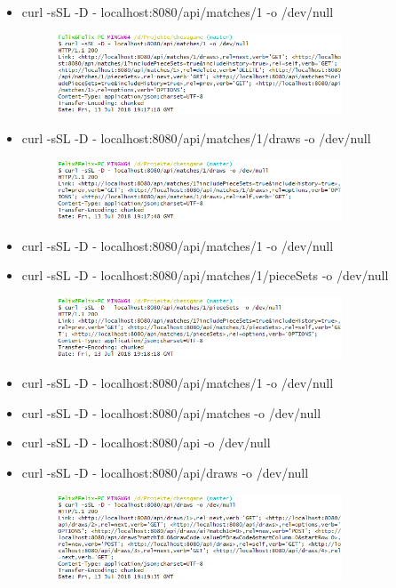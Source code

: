 \begin{enumerate}
\begin{itemize}
\begin{figure}[h]
				\end{figure}
			\item curl -sSL -D - localhost:8080/api/matches/1 -o /dev/null
				\begin{figure}[h]
					\includegraphics[width=0.8\textwidth]{images/question3.7.png}
				\end{figure}
			\item curl -sSL -D - localhost:8080/api/matches/1/draws -o /dev/null
				\begin{figure}[h]
					\includegraphics[width=0.8\textwidth]{images/question3.8.png}
				\end{figure}
			\item curl -sSL -D - localhost:8080/api/matches/1 -o /dev/null
			\item curl -sSL -D - localhost:8080/api/matches/1/pieceSets -o /dev/null
				\begin{figure}[h]
					\includegraphics[width=0.8\textwidth]{images/question3.10.png}
				\end{figure}
			\item curl -sSL -D - localhost:8080/api/matches/1 -o /dev/null
			\item curl -sSL -D - localhost:8080/api/matches -o /dev/null
			\item curl -sSL -D - localhost:8080/api -o /dev/null
			\item curl -sSL -D - localhost:8080/api/draws -o /dev/null
				\begin{figure}[h]
					\includegraphics[width=0.8\textwidth]{images/question3.14.png}

\end{figure}
\end{itemize}
\end{enumerate}
